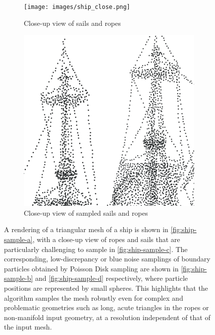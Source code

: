 \documentclass[oneside, a4paper]{book}
\begin{document}
\begin{figure}
      \begin{subfigure}[t][0.4\textwidth]{0.4\textwidth}
        \texttt{[image: images/ship\_close.png]}
        \caption{Close-up view of sails and ropes}
        \label{fig:ship-sample-c}
      \end{subfigure}
      \hfill
      \begin{subfigure}[t][0.4\textwidth]{0.4\textwidth}
        \includegraphics[width=\textwidth]{images/ship_sample_close_inv.png}
        \caption{Close-up view of sampled sails and ropes}
        \label{fig:ship-sample-d}
      \end{subfigure}
      \vspace{0.5cm}
      \caption{A rendering of a triangular mesh of a ship is shown in \autoref{fig:ship-sample-a}, with a close-up view of ropes and sails that are particularly challenging to sample in \autoref{fig:ship-sample-c}. The corresponding, low-discrepancy or blue noise samplings of boundary particles obtained by Poisson Disk sampling \autocite{pcu} are shown in \autoref{fig:ship-sample-b} and \autoref{fig:ship-sample-d} respectively, where particle positions are represented by small spheres. This highlights that the algorithm samples the mesh robustly even for complex and problematic geometries such as long, acute triangles in the ropes or non-manifold input geometry, at a resolution independent of that of the input mesh.}
      \label{fig:boundary-sampling}
    \end{figure}
\end{document}
